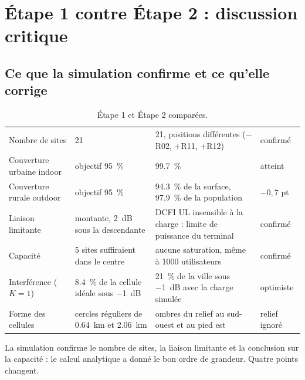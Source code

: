 \chapter{Étape 1 contre Étape 2 : discussion critique}
\label{ch-disc}

\section{Ce que la simulation confirme et ce qu'elle corrige}

\begin{table}[H]
\centering
\caption{Étape 1 et Étape 2 comparées.}
\label{tab-compare}
\begin{tabularx}{\textwidth}{@{}lLLl@{}}
\toprule
{} &  &  &  \\
\midrule
Nombre de sites & 21 & 21, positions différentes ($-$R02, +R11, +R12) & confirmé \\
Couverture urbaine indoor & objectif \SI{95}{\percent} & \SI{99,7}{\percent} & atteint \\
Couverture rurale outdoor & objectif \SI{95}{\percent} & \SI{94,3}{\percent} de la surface, \SI{97,9}{\percent} de la population & $-0{,}7$ pt \\
Liaison limitante & montante, \SI{2}{\deci\bel} sous la descendante & DCFI UL insensible à la charge : limite de puissance du terminal & confirmé \\
Capacité & 5 sites suffiraient dans le centre & aucune saturation, même à \num{1000} utilisateurs & confirmé \\
Interférence ($K = 1$) & \SI{8,4}{\percent} de la cellule idéale sous \SI{-1}{\deci\bel} & \SI{21}{\percent} de la ville sous \SI{-1}{\deci\bel} avec la charge simulée & optimiste \\
Forme des cellules & cercles réguliers de \SI{0,64}{\kilo\metre} et \SI{2,06}{\kilo\metre} & ombres du relief au sud-ouest et au pied est & relief ignoré \\
\bottomrule
\end{tabularx}
\end{table}

La simulation confirme le nombre de sites, la liaison limitante et la conclusion sur la capacité : le calcul analytique a donné le bon ordre de grandeur. Quatre points changent.

